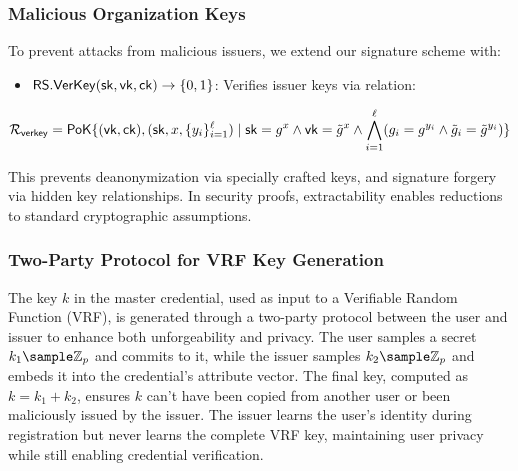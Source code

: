 \subsubsection{Malicious Organization Keys}
To prevent attacks from malicious issuers, we extend our signature scheme with:
\begin{itemize}
    \item $\mathsf{RS.VerKey}(\mathsf{sk}, \mathsf{vk}, \mathsf{ck}) \to \{0,1\}$: Verifies issuer keys via relation:
\end{itemize}
\[
\mathcal{R}_{\mathsf{verkey}} ={\mathsf{PoK}} \{(\mathsf{vk}, \mathsf{ck}),(\mathsf{sk}, x, \{y_i\}_{i=1}^\ell) \mid \mathsf{sk} = g^x \wedge \mathsf{vk} = \tilde{g}^x \wedge \bigwedge_{i=1}^\ell (g_i = g^{y_i} \wedge \tilde{g}_i = \tilde{g}^{y_i})\}
\]

This prevents deanonymization via specially crafted keys, and signature forgery via hidden key relationships. In security proofs, extractability enables reductions to standard cryptographic assumptions.

\subsubsection{Two-Party Protocol for VRF Key Generation}
The key $k$ in the master credential, used as input to a Verifiable Random Function (VRF), is generated through a two-party protocol between the user and issuer to enhance both unforgeability and privacy. The user samples a secret $k_1 \sample \mathbb{Z}_p$ and commits to it, while the issuer samples $k_2 \sample \mathbb{Z}_p$ and embeds it into the credential's attribute vector. The final key, computed as $k = k_1 + k_2$, ensures $k$ can't have been copied from another user or been maliciously issued by the issuer. The issuer learns the user's identity during registration but never learns the complete VRF key, maintaining user privacy while still enabling credential verification.

